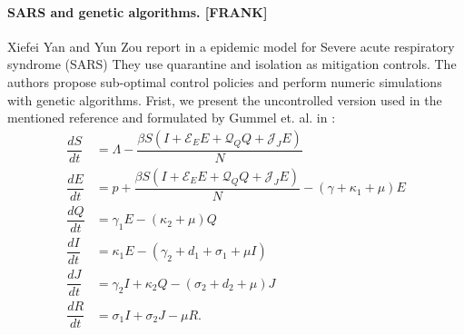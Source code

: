 \paragraph{SARS and genetic algorithms. [FRANK]}
Xiefei Yan and Yun Zou report in \cite{Yan2008} a epidemic model for
Severe acute respiratory syndrome (SARS) They use quarantine and isolation as
mitigation controls. The authors propose sub-optimal control policies and
perform numeric simulations with genetic algorithms. Frist, we present the
uncontrolled version used in the mentioned reference and formulated by Gummel 
et. al. in \cite{Gumel2004}:
%
%
\begin{equation}
	\begin{aligned}
		\dfrac{dS}{dt} &=
			\Lambda 
			-\dfrac{
				\beta S
				\left(
					I + \mathcal{E}_E E
					+ \mathcal{Q}_Q Q
					+ \mathcal{J}_J E
				\right)
			}{N}
		\\
		\dfrac{dE}{dt} &=
			p +
			\dfrac{
				\beta S
				\left(
					I + \mathcal{E}_E E
						+ \mathcal{Q}_Q Q
						+ \mathcal{J}_J E
				\right)
			}{N}
			-(\gamma + \kappa_1 + \mu) E
		\\
		\dfrac{dQ}{dt} &=
			\gamma_1 E 
			- (\kappa_2 + \mu) Q
		\\
		\dfrac{dI}{dt} &=
			\kappa_1 E 
			-(\gamma_2 + d_1  + \sigma_1 + \mu I)
		\\
		\dfrac{dJ}{dt} &=
			\gamma_2 I 
			+ \kappa_2 Q
			- (\sigma_2 + d_2 + \mu) J
		\\
		\dfrac{dR}{dt} &=
			\sigma_1 I
			+\sigma_2 J
			- \mu R.
	\end{aligned}
\end{equation}
